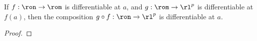 \begin{theorem}
    \label{chainrule}
    If $f:\ron\to\rom$ is differentiable at $a$,
    and $g:\rom\to\rl^p$ is differentiable at
    $f(a)$, then the composition $g\circ f:
    \ron\to\rl^p$ is differentiable at $a$.
\end{theorem}
\begin{tcolorbox}
    \begin{proof}
        
    \end{proof}
\end{tcolorbox}